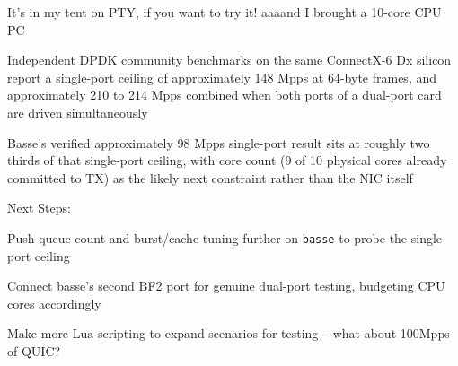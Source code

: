 \documentclass[Screen16to9,17pt]{foils}
\begin{document}
It's in my tent on PTY, if you want to try it! aaaand I brought a 10-core CPU PC



Independent DPDK community benchmarks on the same ConnectX-6 Dx silicon report a single-port ceiling of approximately 148 Mpps at 64-byte frames, and approximately 210 to 214 Mpps combined when both ports of a dual-port card are driven simultaneously

Basse's verified approximately 98 Mpps single-port result sits at roughly two thirds of that single-port ceiling, with core count (9 of 10 physical cores already committed to TX) as the likely next constraint rather than the NIC itself

Next Steps:\\
\begin{list2}
\item Push queue count and burst/cache tuning further on \verb+basse+ to probe the single-port ceiling
\item Connect basse's second BF2 port for genuine dual-port testing, budgeting CPU cores accordingly
\item Make more Lua scripting to expand scenarios for testing -- what about 100Mpps of QUIC?
\end{list2}

\myquestionspage
\end{document}
